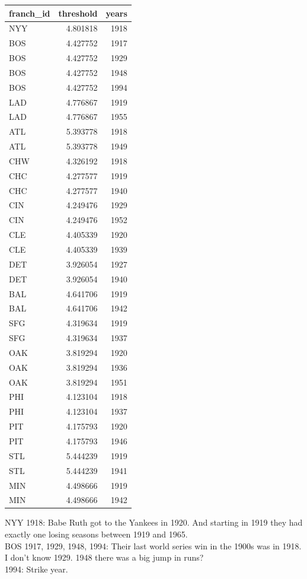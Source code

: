 \documentclass[
  12pt,
]{article}
\begin{document}
\begin{longtable}[]{@{}lrr@{}}
\toprule
franch\_id & threshold & years \\
\midrule
\endhead
NYY & 4.801818 & 1918 \\
BOS & 4.427752 & 1917 \\
BOS & 4.427752 & 1929 \\
BOS & 4.427752 & 1948 \\
BOS & 4.427752 & 1994 \\
LAD & 4.776867 & 1919 \\
LAD & 4.776867 & 1955 \\
ATL & 5.393778 & 1918 \\
ATL & 5.393778 & 1949 \\
CHW & 4.326192 & 1918 \\
CHC & 4.277577 & 1919 \\
CHC & 4.277577 & 1940 \\
CIN & 4.249476 & 1929 \\
CIN & 4.249476 & 1952 \\
CLE & 4.405339 & 1920 \\
CLE & 4.405339 & 1939 \\
DET & 3.926054 & 1927 \\
DET & 3.926054 & 1940 \\
BAL & 4.641706 & 1919 \\
BAL & 4.641706 & 1942 \\
SFG & 4.319634 & 1919 \\
SFG & 4.319634 & 1937 \\
OAK & 3.819294 & 1920 \\
OAK & 3.819294 & 1936 \\
OAK & 3.819294 & 1951 \\
PHI & 4.123104 & 1918 \\
PHI & 4.123104 & 1937 \\
PIT & 4.175793 & 1920 \\
PIT & 4.175793 & 1946 \\
STL & 5.444239 & 1919 \\
STL & 5.444239 & 1941 \\
MIN & 4.498666 & 1919 \\
MIN & 4.498666 & 1942 \\
\bottomrule
\end{longtable}

NYY 1918: Babe Ruth got to the Yankees in 1920. And starting in 1919
they had exactly one losing seasons between 1919 and 1965.\\
BOS 1917, 1929, 1948, 1994: Their last world series win in the 1900s was
in 1918.\\
I don't know 1929. 1948 there was a big jump in runs?\\
1994: Strike year.
\end{document}
